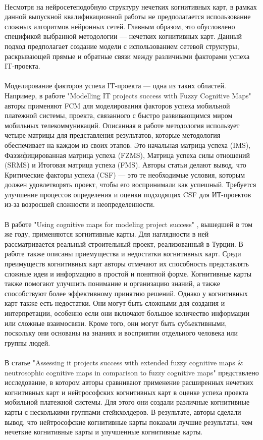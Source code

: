 \documentclass{article}
\begin{document}
    ~\\
    Несмотря на нейросетеподобную структуру нечетких когнитивных карт, в рамках данной выпускной квалификационной работы не предполагается использование сложных алгоритмов нейронных сетей. Главным образом, это обусловлено спецификой выбранной методологии — нечетких когнитивных карт. Данный подход предполагает создание модели с использованием сетевой структуры, раскрывающей прямые и обратные связи между различными факторами успеха IT-проекта.\\
    ~\\
    Моделирование факторов успеха IT-проекта — одна из таких областей. Например, в работе "{}Modelling IT projects success with Fuzzy Cognitive Maps"{} \cite{litlink18} авторы применяют FCM для моделирования факторов успеха мобильной платежной системы, проекта, связанного с быстро развивающимся миром мобильных телекоммуникаций. Описанная в работе методология использует четыре матрицы для представления результатов, которые методология обеспечивает на каждом из своих этапов. Это начальная матрица успеха (IMS), Фаззифицированная матрица успеха (FZMS), Матрица успеха силы отношений (SRMS) и Итоговая матрица успеха (FMS). Авторы статьи делают вывод, что Критические факторы успеха (CSF) — это те необходимые условия, которым должен удовлетворять проект, чтобы его воспринимали как успешный. Требуется улучшение процессов определения и оценки подходящих CSF для ИТ-проектов из-за возросшей сложности и неопределенности.\\
    ~\\
    В работе "{}Using cognitive maps for modeling project success"{} \cite{litlink19}, вышедшей в том же году, применяются когнитивные карты. Для наглядности в ней рассматривается реальный строительный проект, реализованный в Турции. В работе также описаны приемущества и недостатки когнитивных карт. Среди преимуществ когнитивных карт авторы отмечают их способность представлять сложные идеи и информацию в простой и понятной форме. Когнитивные карты также помогают улучшить понимание и организацию знаний, а также способствуют более эффективному принятию решений. Однако у когнитивных карт также есть недостатки. Они могут быть сложными для создания и интерпретации, особенно если они включают большое количество информации или сложные взаимосвязи. Кроме того, они могут быть субъективными, поскольку они основаны на знаниях и восприятии отдельного человека или группы людей.\\
    ~\\
    В статье "{}Assessing it projects success with extended fuzzy cognitive maps \& neutrosophic cognitive maps in comparison to fuzzy cognitive maps"{} \cite{litlink20} представлено исследование, в котором авторы сравнивают применение расширенных нечетких когнитивных карт и нейтрософских когнитивных карт в оценке успеха проекта мобильной платежной системы. Для этого они создали различные когнитивные карты с несколькими группами стейкхолдеров. В результате, авторы сделали вывод, что нейтрософские когнитивные карты показали лучшие результаты, чем нечеткие когнитивные карты и улучшенные когнитивные карты.\\
\end{document}
